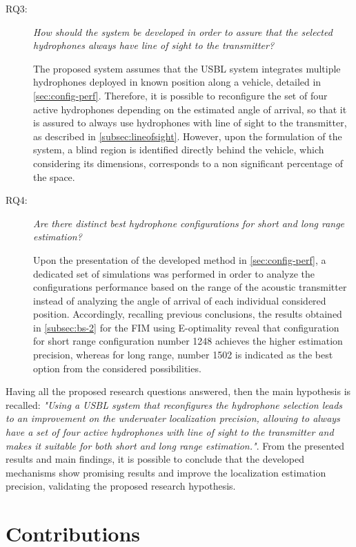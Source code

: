 \begin{description}
	\item[RQ3: ]\textit{How should the system be developed in order to assure that the selected hydrophones always have line of sight to the transmitter?}
	
	The proposed system assumes that the USBL system integrates multiple hydrophones deployed in known position along a vehicle, detailed in \ref{sec:config-perf}. Therefore, it is possible to reconfigure the set of four active hydrophones depending on the estimated angle of arrival, so that it is assured to always use hydrophones with line of sight to the transmitter, as described in \ref{subsec:lineofsight}. However, upon the formulation of the system, a blind region is identified directly behind the vehicle, which considering its dimensions, corresponds to a non significant percentage of the space.
	
	\item[RQ4: ] \textit{Are there distinct best hydrophone configurations for short and long range estimation?}
	
	Upon the presentation of the developed method in \ref{sec:config-perf}, a dedicated set of simulations was performed in order to analyze the configurations performance based on the range of the acoustic transmitter instead of analyzing the angle of arrival of each individual considered position. Accordingly, recalling previous conclusions, the results obtained in \ref{subsec:bs-2} for the FIM using E-optimality reveal that configuration for short range configuration number 1248 achieves the higher estimation precision, whereas for long range, number 1502 is indicated as the best option from the considered possibilities.
	
\end{description}

Having all the proposed research questions answered, then the main hypothesis is recalled: \textit{"Using a USBL system that reconfigures the hydrophone selection leads to an improvement on the underwater localization precision, allowing to always have a set of four active hydrophones with line of sight to the transmitter and makes it suitable for both short and long range estimation."}. From the presented results and main findings, it is possible to conclude that the developed mechanisms show promising results and  improve the localization estimation precision, validating the proposed research hypothesis.

\section{Contributions }

